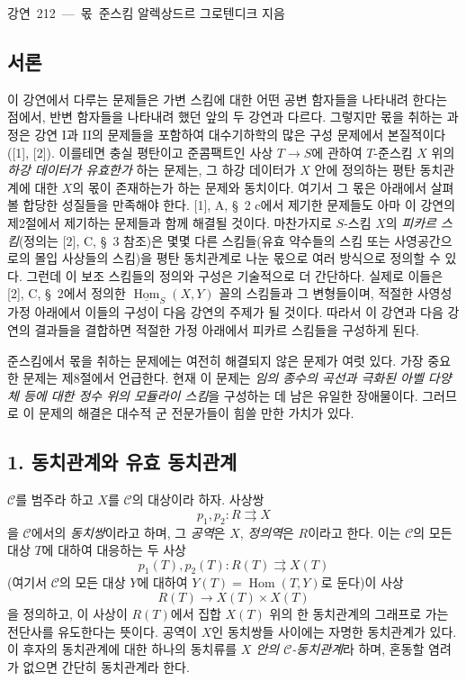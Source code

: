 \unit{강연 212 — 몫 준스킴}
%
  {알렉상드르 그로텐디크 지음}

\subsection*{서론}

이 강연에서 다루는 문제들은 가변 스킴에 대한 어떤 공변 함자들을
나타내려 한다는 점에서, 반변 함자들을 나타내려 했던 앞의 두 강연과
다르다. 그렇지만 몫을 취하는 과정은 강연 I과 II의 문제들을 포함하여
대수기하학의 많은 구성 문제에서 본질적이다([1], [2]). 이를테면 충실
평탄이고 준콤팩트인 사상 $T\longrightarrow S$에 관하여 $T$-준스킴
$X$ 위의 \emph{하강 데이터가 유효한가} 하는 문제는, 그 하강 데이터가
$X$ 안에 정의하는 평탄 동치관계에 대한 $X$의 몫이 존재하는가 하는
문제와 동치이다. 여기서 그 몫은 아래에서 살펴볼 합당한 성질들을
만족해야 한다. [1], A, \S~2 c에서 제기한 문제들도 아마 이 강연의
제2절에서 제기하는 문제들과 함께 해결될 것이다. 마찬가지로
$S$-스킴 $X$의 \emph{피카르 스킴}(정의는 [2], C, \S~3 참조)은
몇몇 다른 스킴들(유효 약수들의 스킴 또는 사영공간으로의 몰입 사상들의
스킴)을 평탄 동치관계로 나눈 몫으로 여러 방식으로 정의할 수 있다.
그런데 이 보조 스킴들의 정의와 구성은 기술적으로 더 간단하다. 실제로
이들은 [2], C, \S~2에서 정의한
$\underline{\operatorname{Hom}}_S(X,Y)$ 꼴의 스킴들과 그 변형들이며,
적절한 사영성 가정 아래에서 이들의 구성이 다음 강연의 주제가 될
것이다. 따라서 이 강연과 다음 강연의 결과들을 결합하면 적절한 가정
아래에서 피카르 스킴들을 구성하게 된다.

준스킴에서 몫을 취하는 문제에는 여전히 해결되지 않은 문제가 여럿
있다. 가장 중요한 문제는 제8절에서 언급한다. 현재 이 문제는
\emph{임의 종수의 곡선과 극화된 아벨 다양체 등에 대한 정수 위의
모듈라이 스킴}을 구성하는 데 남은 유일한 장애물이다. 그러므로 이
문제의 해결은 대수적 군 전문가들이 힘쓸 만한 가치가 있다.

\subsection*{1. 동치관계와 유효 동치관계}

$\mathcal C$를 범주라 하고 $X$를 $\mathcal C$의 대상이라 하자. 사상쌍
\[
  p_1,p_2:R\rightrightarrows X
\]
을 $\mathcal C$에서의 \emph{동치쌍}이라고 하며, 그 \emph{공역}은
$X$, \emph{정의역}은 $R$이라고 한다. 이는 $\mathcal C$의 모든 대상
$T$에 대하여 대응하는 두 사상
\[
  p_1(T),p_2(T):R(T)\rightrightarrows X(T)
\]
(여기서 $\mathcal C$의 모든 대상 $Y$에 대하여
$Y(T)=\operatorname{Hom}(T,Y)$로 둔다)이 사상
\[
  R(T)\longrightarrow X(T)\times X(T)
\]
을 정의하고, 이 사상이 $R(T)$에서 집합 $X(T)$ 위의 한 동치관계의
그래프로 가는 전단사를 유도한다는 뜻이다. 공역이 $X$인 동치쌍들
사이에는 자명한 동치관계가 있다. 이 후자의 동치관계에 대한 하나의
동치류를 \emph{$X$ 안의 $\mathcal C$-동치관계}라 하며, 혼동할
염려가 없으면 간단히 동치관계라 한다.

